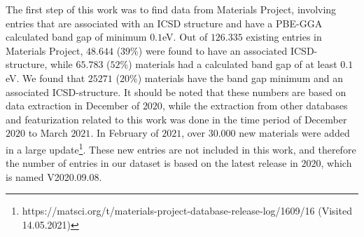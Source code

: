 \begin{comment}
\section{Time of extraction and featurization}

The initial thought behind

\begin{table}[!ht]
\centering
\caption{}
\label{tab:timing-extraction}
\noindent\makebox[\textwidth]{
\begin{tabular}{M{3.0cm} M{4.0cm} M{4.0cm}}
  \hline
  \hline
  Database & Extraction period & Estimated time usage  \\
  \hline
  Materials Project & December $2020$ & $5$ min \\
  Citrine Informatics & December $2020$ & $2$ min  \\
  OQMD & December $2020$ & $3$ min \\
  AFLOW & January $2020$ - February $2021$ & $17$ days \\
  AFLOW-ML & January $2020$ - February $2021$ & $16$ days \\
  JARVIS-DFT & January $2020$ & $5$ min \\
  \hline
  \hline
\end{tabular}
}
\end{table}

\end{comment}
The first step of this work was to find data from Materials Project, involving entries that are associated with an ICSD structure and have a PBE-GGA calculated band gap of minimum $0.1$eV. Out of $126.335$ existing entries in Materials Project, $48.644$ ($39\%$) were found to have an associated ICSD-structure, while $65.783$ ($52\%$) materials had a calculated band gap of at least $0.1$eV. We found that $25271$ ($20\%$) materials have the band gap minimum and an associated ICSD-structure. It should be noted that these numbers are based on data extraction in December of $2020$, while the extraction from other databases and featurization related to this work was done in the time period of December $2020$ to March $2021$. In February of $2021$, over $30.000$ new materials were added in a large update\footnote{https://matsci.org/t/materials-project-database-release-log/1609/16 (Visited 14.05.2021)}. These new entries are not included in this work, and therefore the number of entries in our dataset is based on the latest release in $2020$, which is named V2020.09.08.%

